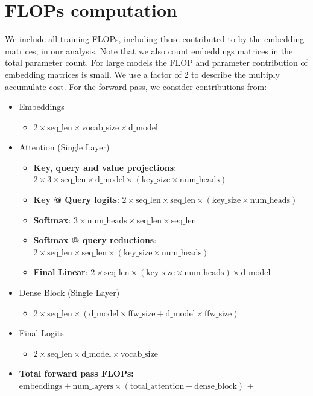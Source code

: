 \documentclass[11pt, a4paper, logo, copyright, nonumbering]{deepmind}
\begin{document}
\section{FLOPs computation}
\label{sec:flops}
We include all training FLOPs, including those contributed to by the embedding matrices, in our analysis. Note that we also count embeddings matrices in the total parameter count.
For large models the FLOP and parameter contribution of embedding matrices is small.
We use a factor of 2 to describe the multiply accumulate cost.
For the forward pass, we consider contributions from:
\begin{itemize}
\item Embeddings
\begin{itemize}
    \item $2 \times \text{seq\_len} \times \text{vocab\_size} \times \text{d\_model} $
\end{itemize}
\item Attention (Single Layer)
\begin{itemize}
\item \textbf{Key, query and value projections}: $2 \times 3 \times \text{seq\_len} \times \text{d\_model} \times ( \text{key\_size} \times \text{num\_heads})$
\item \textbf{Key @ Query logits}: $2  \times \text{seq\_len} \times \text{seq\_len} \times ( \text{key\_size} \times \text{num\_heads}) $
\item \textbf{Softmax}: $3 \times \text{num\_heads}\times \text{seq\_len} \times \text{seq\_len}  $
\item \textbf{Softmax @ query reductions}: $2  \times \text{seq\_len} \times \text{seq\_len} \times ( \text{key\_size} \times \text{num\_heads}) $
\item \textbf{Final Linear}: $2 \times \text{seq\_len} \times (\text{key\_size} \times \text{num\_heads}) \times \text{d\_model} $
\end{itemize}
\item Dense Block (Single Layer)
\begin{itemize}
        \item $2 \times \text{seq\_len} \times (\text{d\_model} \times \text{ffw\_size} +\text{d\_model} \times \text{ffw\_size})$
\end{itemize}
\item Final Logits
\begin{itemize}
        \item $2 \times \text{seq\_len} \times \text{d\_model} \times \text{vocab\_size}$
\end{itemize}
\item \textbf{Total forward pass FLOPs:} $\text{embeddings} + \text{num\_layers} \times (\text{total\_attention} + \text{dense\_block})$ + 
\end{itemize}
\end{document}
